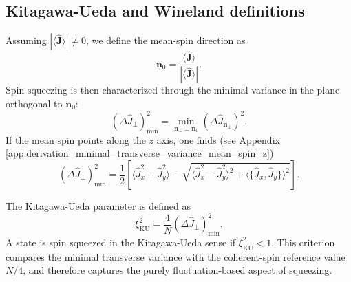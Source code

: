 \subsection{Kitagawa-Ueda and Wineland definitions}

Assuming \( |\langle \hat{\mathbf{J}}\rangle| \neq 0 \), we define the mean-spin direction as
\begin{equation}
	\mathbf{n}_0=\frac{\langle \hat{\mathbf{J}}\rangle}{|\langle \hat{\mathbf{J}}\rangle|}.
	\label{eq:intro_qm_mean_spin_direction}
\end{equation}
Spin squeezing is then characterized through the minimal variance in the plane orthogonal to \(\mathbf{n}_0\):
\begin{equation}
	(\Delta \hat J_\perp)^2_{\min}
	=
	\min_{\mathbf{n}_\perp\perp\mathbf{n}_0}
	(\Delta \hat J_{\mathbf{n}_\perp})^2.
	\label{eq:intro_qm_minimal_transverse_variance_definition}
\end{equation}
If the mean spin points along the \(z\) axis, one finds (see Appendix \ref{app:derivation_minimal_transverse_variance_mean_spin_z})
\begin{equation}
	(\Delta \hat J_\perp)^2_{\min}
	=
	\frac{1}{2}
	\left[
	\langle \hat J_x^2+\hat J_y^2\rangle
	-
	\sqrt{
		\langle \hat J_x^2-\hat J_y^2\rangle^2
		+
		\langle \{\hat J_x,\hat J_y\}\rangle^2
	}
	\right].
	\label{eq:intro_qm_minimal_transverse_variance_mean_spin_z_ss}
\end{equation}

The Kitagawa-Ueda parameter is defined as \cite{KitagawaUeda93,Ma11}
\begin{equation}
	\xi_{\mathrm{KU}}^{2}
	=
	\frac{4}{N}
	(\Delta \hat J_\perp)^2_{\min}.
	\label{eq:intro_qm_ku_parameter_definition_ss}
\end{equation}
A state is spin squeezed in the Kitagawa-Ueda sense if \( \xi_{\mathrm{KU}}^2<1 \). This criterion compares the minimal transverse variance with the coherent-spin reference value \(N/4\), and therefore captures the purely fluctuation-based aspect of squeezing.

